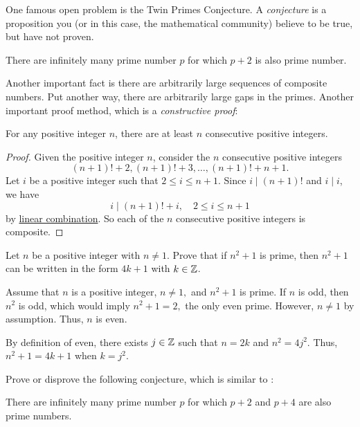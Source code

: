 \documentclass{ximera}
\begin{document}
One famous open problem is the Twin Primes Conjecture. A \emph{conjecture} is a proposition you (or in this case, the mathematical community) believe to be true, but have not proven.

\begin{conjecture}\label{conj:twin-primes}
  There are infinitely many prime number $p$ for which $p+2$ is also prime number.
\end{conjecture}

Another important fact is there are arbitrarily large sequences of composite numbers. Put another way, there are arbitrarily large gaps in the primes. Another important proof method, which is a \emph{constructive proof}:

\begin{theorem}\label{prop:gaps-primes}
  For any positive integer $n$, there are at least $n$ consecutive positive integers.
  \begin{proof}
    Given the positive integer $n$, consider the $n$ consecutive positive integers \[(n+1)!+2, (n+1)!+3,\dots, (n+1)!+n+1.\]
    Let $i$ be a positive integer such that $2\leq i\leq n+1$. Since $i\mid (n+1)!$ and $i\mid i$, we have \[i\mid(n+1)! +i,\quad 2\leq i\leq n+1\] by \hyperref[lem:linear-combo]{linear combination}. So each of the $n$ consecutive positive integers is composite.
  \end{proof}
\end{theorem}


  \begin{br} Let $n$ be a positive integer with $n\neq 1$. Prove that if $n^2+1$ is prime, then $n^2+1$ can be written in the form $4k+1$ with $k\in\mathbb Z$.
  \begin{solution}
   Assume that $n$ is a positive integer, $n\neq 1,$ and $n^2+1$ is prime. If $n$ is odd, then $n^2$ is odd, which would imply $n^2+1=2,$ the only even prime. However, $n\neq 1$ by assumption. Thus, $n$ is even. 

    By definition of even, there exists $j\in\mathbb Z$ such that $n=2k$ and $n^2=4j^2$. Thus, $n^2+1=4k+1$ when $k=j^2.$
  \end{solution}
\end{br}

  \begin{br}
    Prove or disprove the following conjecture, which is similar to :

    \begin{conjecture}
      There are infinitely many prime number $p$ for which $p+2$ and $p+4$ are also prime numbers.
    \end{conjecture}
    \end{br}



\end{document}
